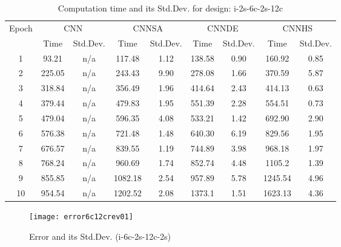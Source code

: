 \documentclass[10pt,letterpaper]{article}
\begin{document}
\begin{table}[]
\small
\caption{Computation time and its Std.Dev. for design: i-2s-6c-2s-12c}
\label{tab:my_label}

\begin{tabular}{c c c c c c c c c}
\hline
\multicolumn{1}{c}{\multirow{2}{*}{Epoch}} & \multicolumn{2}{c}{CNN} &
\multicolumn{2}{c}{CNNSA} & \multicolumn{2}{c}{CNNDE} & \multicolumn{2}{c}{CNNHS}\\
\cline{2-9}

\multicolumn{1}{r}{}       & \multicolumn{1}{c}{Time} & \multicolumn{1}{c}{Std.Dev.} &
\multicolumn{1}{c}{Time} & \multicolumn{1}{c}{Std.Dev.}  & \multicolumn{1}{c}{Time} &
\multicolumn{1}{c}{Std.Dev.} & \multicolumn{1}{c}{Time} & \multicolumn{1}{c}{Std.Dev.} \\
\hline

1		& 93.21  & n/a    & 117.48  & 1.12  & 138.58  & 0.90    & 160.92  & 0.85  \\
2 		& 225.05 & n/a    & 243.43  & 9.90  & 278.08  & 1.66    & 370.59  & 5.87  \\
3		& 318.84 & n/a    & 356.49  & 1.96  & 414.64  & 2.43    & 414.13  & 0.63  \\
4		& 379.44 & n/a    & 479.83  & 1.95  & 551.39  & 2.28 	& 554.51  & 0.73  \\
5		& 479.04 & n/a    & 596.35  & 4.08  & 533.21  & 1.42    & 692.90  & 2.90  \\
6		& 576.38 & n/a    & 721.48  & 1.48  & 640.30  & 6.19    & 829.56  & 1.95  \\
7 		& 676.57 & n/a    & 839.55  & 1.19  & 744.89  & 3.98    & 968.18  & 1.97  \\
8		& 768.24 & n/a    & 960.69  & 1.74  & 852.74  & 4.48    & 1105.2  & 1.39  \\
9		& 855.85 & n/a    & 1082.18 & 2.54  & 957.89  & 5.78    & 1245.54 & 4.96  \\
10		& 954.54 & n/a    & 1202.52 & 2.08  & 1373.1  & 1.51    & 1623.13 & 4.36 \\

\hline
\end{tabular}
\end{table}



\begin{figure}
\texttt{[image: error6c12crev01]}
\caption{Error and its Std.Dev. (i-6c-2s-12c-2s)}
\label{fig:my_label}
\end{figure}
\end{document}
